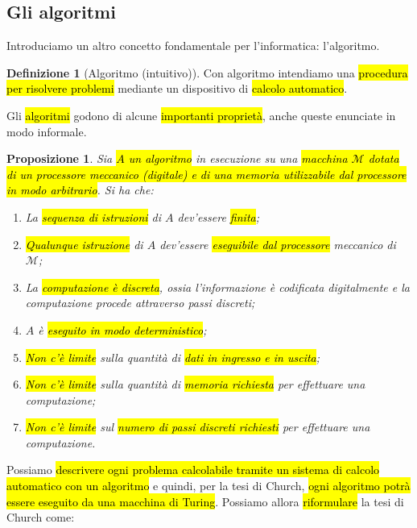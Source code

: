 \documentclass[a4paper,11pt,oneside]{article}
\theoremstyle{plain}
\newtheorem{prop}{Proposizione}[section]
\theoremstyle{definition}
\newtheorem{defn}{Definizione}[section]
\theoremstyle{remark}
\begin{document}
\subsection{Gli algoritmi}

Introduciamo un altro concetto fondamentale per l'informatica: l'algoritmo.

\begin{defn}[Algoritmo (intuitivo)]\label{def:alg-non-formale}
  Con algoritmo intendiamo una \hl{procedura per risolvere problemi} mediante un
  dispositivo di \hl{calcolo automatico}.
\end{defn}

Gli \hl{algoritmi} godono di alcune \hl{importanti proprietà}, anche queste
enunciate in modo informale.

\begin{prop}
  Sia \hl{$A$ un algoritmo} in esecuzione su una \hl{macchina $\mathcal{M}$
  dotata di un processore meccanico (digitale) e di una memoria utilizzabile dal
  processore in modo arbitrario}. Si ha che:

  \begin{enumerate}
    \item La \hl{sequenza di istruzioni} di $A$ dev'essere \hl{finita};
    \item \hl{Qualunque istruzione} di $A$ dev'essere \hl{eseguibile dal
      processore} meccanico di $\mathcal{M}$;
    \item La \hl{computazione è discreta}, ossia l'informazione è codificata
      digitalmente e la computazione procede attraverso passi discreti;
    \item $A$ è \hl{eseguito in modo deterministico};
    \item \hl{Non c'è limite} sulla quantità di \hl{dati in ingresso e in
      uscita};
    \item \hl{Non c'è limite} sulla quantità di \hl{memoria richiesta} per
      effettuare una computazione;
    \item \hl{Non c'è limite} sul \hl{numero di passi discreti richiesti} per
      effettuare una computazione.
  \end{enumerate}
\end{prop}

Possiamo \hl{descrivere ogni problema calcolabile tramite un sistema di calcolo
automatico con un algoritmo} e quindi, per la tesi di Church, \hl{ogni algoritmo
potrà essere eseguito da una macchina di Turing}. Possiamo allora
\hl{riformulare} la tesi di Church come:
\end{document}

